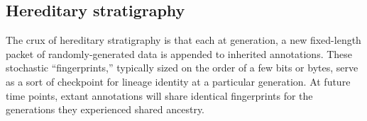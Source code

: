 

\subsection{Hereditary stratigraphy}

The crux of hereditary stratigraphy is that each at generation, a new fixed-length packet of randomly-generated data is appended to inherited annotations.
These stochastic ``fingerprints,'' typically sized on the order of a few bits or bytes, serve as a sort of checkpoint for lineage identity at a particular generation.
At future time points, extant annotations will share identical fingerprints for the generations they experienced shared ancestry.


